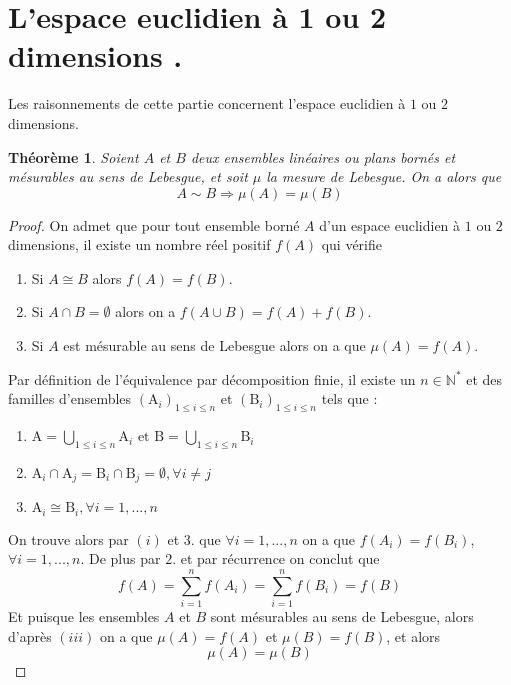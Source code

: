 \section{L'espace euclidien à 1 ou 2 dimensions .}
\newtheorem{defff}{Définition}
\newtheorem{TTT}{Théorème}
\newtheorem{Coo}{Corollaire}
\newtheorem{PRR}{Proposition}
\newtheorem{rr}{Remarque}
\newtheorem{lm}{Lemme}
\noindent
Les raisonnements de cette partie concernent l'espace euclidien à $1$ ou $2$ dimensions.

\begin{TTT}\label{pr}
  Soient $A$ et $B$ deux ensembles linéaires ou plans bornés et mésurables au sens de Lebesgue, et soit $\mu$ la mesure de Lebesgue. On a alors que
  $$A \sim B \Rightarrow \mu(A) = \mu(B)$$
\end{TTT}
\begin{proof}
  On admet que pour tout ensemble borné $A$ d'un espace euclidien à $1$ ou $2$ dimensions, il existe un nombre réel positif $f(A)$ qui vérifie
  \begin{enumerate}[label=(\roman*)]
    \item Si $A \cong B$ alors $f(A) = f(B)$.
    \item Si $A \cap B = \emptyset$ alors on a $f(A\cup B) = f(A)+f(B)$.
    \item Si $A$ est mésurable au sens de Lebesgue alors on a que $\mu(A) = f(A)$.
  \end{enumerate}
  Par définition de l'équivalence par décomposition finie, il existe un $n \in \mathbb{N}^*$ et des familles d'ensembles $\left(\mathrm{A}_i\right)_{1\le i \le n}$ et $\left(\mathrm{B}_i\right)_{1\le i \le n}$ tels que :
  \begin{center}
  \begin{enumerate}
    \item $\mathrm{A} = \underset{1\le i \le n}{\bigcup}\mathrm{A}_i \text{ et } \mathrm{B} = \underset{1\le i \le n}{\bigcup}\mathrm{B}_i$
    \item $\mathrm{A}_i \cap \mathrm{A}_j = \mathrm{B}_i \cap \mathrm{B}_j = \emptyset, \forall i\neq j$
    \item $\mathrm{A}_i \cong \mathrm{B}_i, \forall i=1, ...,n$
  \end{enumerate}
\end{center}
On trouve alors par $(i)$ et $3.$ que $\forall i=1,...,n$ on a que $f(A_i) = f(B_i)$, $\forall i=1,...,n$. De plus par $2.$ et par récurrence on conclut que $$f(A) = \sum_{i=1}^n f(A_i) = \sum_{i=1}^n f(B_i) = f(B)$$
Et puisque les ensembles $A$ et $B$ sont mésurables au sens de Lebesgue, alors d'après $(iii)$ on a que $\mu(A) = f(A)$ et $\mu(B) = f(B)$, et alors $$\mu(A) = \mu(B)$$
\end{proof}
